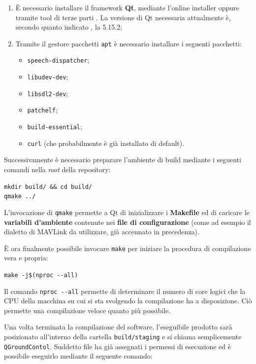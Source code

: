 \documentclass[a4paper, 12pt, oneside]{article}
\begin{document}
\begin{enumerate}
    \item È necessario installare il framework \textbf{Qt}, mediante l'online installer oppure tramite tool di terze parti \cite{aqtinstall}. La versione di Qt necessaria attualmente è, secondo quanto indicato \cite{build-qgc}, la 5.15.2;
    \item Tramite il gestore pacchetti \texttt{apt} è necessario installare i seguenti pacchetti:
        \begin{itemize}
            \item \texttt{speech-dispatcher};
            \item \texttt{libudev-dev};
            \item \texttt{libsdl2-dev};
            \item \texttt{patchelf};
            \item \texttt{build-essential};
            \item \texttt{curl} (che probabilmente è già installato di default).
        \end{itemize}
\end{enumerate}

Successivamente è necessario preparare l'ambiente di build mediante i seguenti comandi nella \textit{root} della repository:

\begin{center}
    \texttt{mkdir build/ \&\& cd build/} \\
    \texttt{qmake ../}
\end{center}

L'invocazione di \texttt{qmake} permette a Qt di inizializzare i \textbf{Makefile} ed di caricare le \textbf{variabili d'ambiente} contenute nei \textbf{file di configurazione} (come ad esempio il dialetto di MAVLink da utilizzare, già accennato in precedenza).

È ora finalmente possibile invocare \texttt{make} per iniziare la procedura di compilazione vera e propria:

\begin{center}
    \texttt{make -j\$(nproc -{}-all)}
\end{center}

Il comando \texttt{nproc -{}-all} permette di determinare il numero di core logici che la CPU della macchina su cui si sta svolgendo la compilazione ha a disposizione. Ciò permette una compilazione veloce quanto più possibile.

Una volta terminata la compilazione del software, l'eseguibile prodotto sarà posizionato all'interno della cartella \texttt{build/staging} e si chiama semplicemente \texttt{QGroundContol}. Suddetto file ha già assegnati i permessi di esecuzione ed è possibile eseguirlo mediante il seguente comando:
\end{document}
